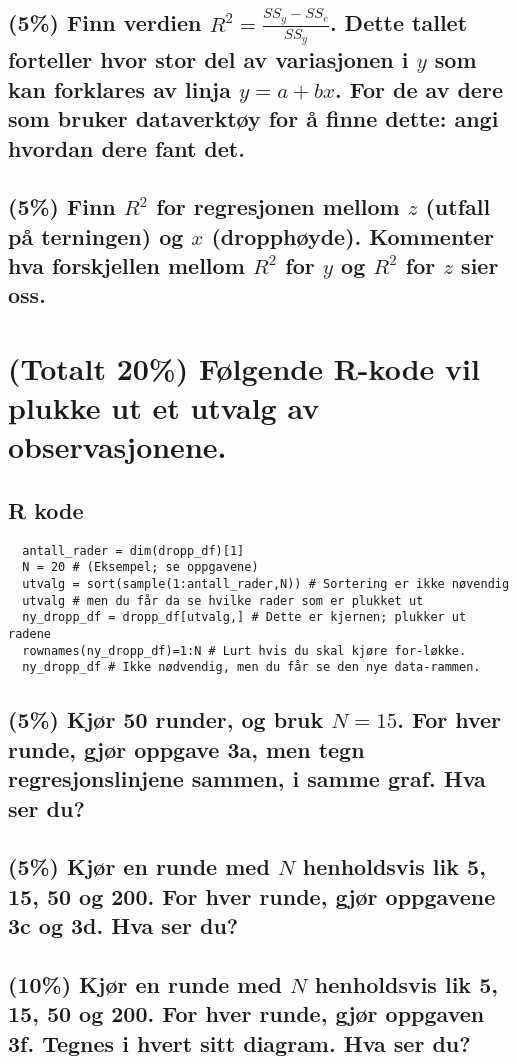 \documentclass[12pt]{article}
\begin{document}
\subsection{(5\%) Finn verdien $R^2 = \frac{SS_y - SS_e}{SS_y}$. Dette tallet forteller hvor stor del av variasjonen i $y$ som kan forklares av linja $y = a + bx$. For de av dere som bruker dataverktøy for å finne dette: angi hvordan dere fant det.}
\subsection{(5\%) Finn $R^2$ for regresjonen mellom $z$ (utfall på terningen) og $x$ (dropphøyde). Kommenter hva forskjellen mellom $R^2$ for $y$ og $R^2$ for $z$ sier oss.}
\section{(Totalt 20\%) Følgende R-kode vil plukke ut et utvalg av observasjonene.}
\subsection*{R kode}
\begin{verbatim}
  antall_rader = dim(dropp_df)[1]
  N = 20 # (Eksempel; se oppgavene)
  utvalg = sort(sample(1:antall_rader,N)) # Sortering er ikke nøvendig
  utvalg # men du får da se hvilke rader som er plukket ut
  ny_dropp_df = dropp_df[utvalg,] # Dette er kjernen; plukker ut radene
  rownames(ny_dropp_df)=1:N # Lurt hvis du skal kjøre for-løkke.
  ny_dropp_df # Ikke nødvendig, men du får se den nye data-rammen.
\end{verbatim}

\subsection{(5\%) Kjør 50 runder, og bruk $N = 15$. For hver runde, gjør oppgave 3a, men tegn regresjonslinjene sammen, i samme graf. Hva ser du?}
\subsection{(5\%) Kjør en runde med $N$ henholdsvis lik 5, 15, 50 og 200. For hver runde, gjør oppgavene 3c og 3d. Hva ser du?}
\subsection{(10\%) Kjør en runde med $N$ henholdsvis lik 5, 15, 50 og 200. For hver runde, gjør oppgaven 3f. Tegnes i hvert sitt diagram. Hva ser du?}
\end{document}
